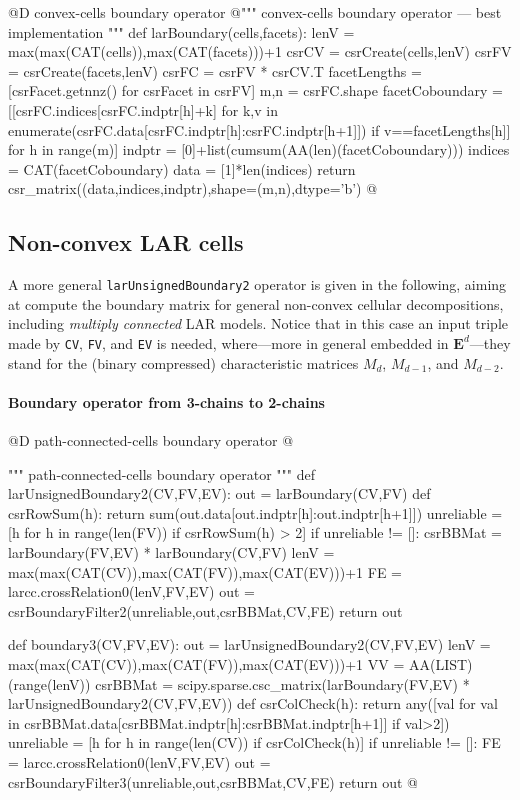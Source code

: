 \documentclass[11pt,oneside]{article}    %
\begin{document}
@D convex-cells boundary operator
@{""" convex-cells boundary operator --- best implementation """
def larBoundary(cells,facets):
    lenV = max(max(CAT(cells)),max(CAT(facets)))+1
    csrCV = csrCreate(cells,lenV)
    csrFV = csrCreate(facets,lenV)
    csrFC = csrFV * csrCV.T
    facetLengths = [csrFacet.getnnz() for csrFacet in csrFV]
    m,n = csrFC.shape
    facetCoboundary = [[csrFC.indices[csrFC.indptr[h]+k] 
        for k,v in enumerate(csrFC.data[csrFC.indptr[h]:csrFC.indptr[h+1]]) 
            if v==facetLengths[h]] for h in range(m)]
    indptr = [0]+list(cumsum(AA(len)(facetCoboundary)))
    indices = CAT(facetCoboundary)
    data = [1]*len(indices)
    return csr_matrix((data,indices,indptr),shape=(m,n),dtype='b')
@}


\subsection{Non-convex LAR cells}

A more general \texttt{larUnsignedBoundary2} operator is given in the following, aiming at compute the boundary matrix for general non-convex cellular decompositions, including \emph{multiply connected} LAR models.
Notice that in this case an input triple made by \texttt{CV}, \texttt{FV}, and \texttt{EV} is needed,
where---more in general embedded in $\mathbf{E}^d$---they stand for the (binary compressed) characteristic matrices $M_d$, $M_{d-1}$, and $M_{d-2}$.

\paragraph{Boundary operator from 3-chains to 2-chains}

@D path-connected-cells boundary operator
@{""" path-connected-cells boundary operator """
def larUnsignedBoundary2(CV,FV,EV):
    out = larBoundary(CV,FV)
    def csrRowSum(h): 
        return sum(out.data[out.indptr[h]:out.indptr[h+1]])    
    unreliable = [h for h in range(len(FV)) if csrRowSum(h) > 2]
    if unreliable != []:
        csrBBMat = larBoundary(FV,EV) * larBoundary(CV,FV)
        lenV = max(max(CAT(CV)),max(CAT(FV)),max(CAT(EV)))+1
        FE = larcc.crossRelation0(lenV,FV,EV)
        out = csrBoundaryFilter2(unreliable,out,csrBBMat,CV,FE)
    return out

def boundary3(CV,FV,EV):
    out = larUnsignedBoundary2(CV,FV,EV)
    lenV = max(max(CAT(CV)),max(CAT(FV)),max(CAT(EV)))+1
    VV = AA(LIST)(range(lenV))
    csrBBMat = scipy.sparse.csc_matrix(larBoundary(FV,EV) * larUnsignedBoundary2(CV,FV,EV))
    def csrColCheck(h): 
        return any([val for val in csrBBMat.data[csrBBMat.indptr[h]:csrBBMat.indptr[h+1]] if val>2])    
    unreliable = [h for h in range(len(CV)) if csrColCheck(h)]
    if unreliable != []:
        FE = larcc.crossRelation0(lenV,FV,EV)
        out = csrBoundaryFilter3(unreliable,out,csrBBMat,CV,FE)
    return out
@}
\end{document}
